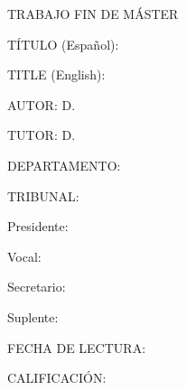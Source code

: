 {\setlength{\parindent}{0cm}
\begin{spanish}
{\scshape\Large TRABAJO FIN DE MÁSTER\par}
\vspace{1cm}
TÍTULO (Español): \myTitleEN \par
\vspace{0.3cm}
\end{spanish}
TITLE (English): \myTitleES \par
\vspace{0.5cm}
\begin{spanish}
AUTOR: D. \myFullname \par
\vspace{0.5cm}
TUTOR: D. \myTutorFullname \par
\vspace{0.5cm}
DEPARTAMENTO: \myDepartment \par
\vspace{2cm}

{\scshape\Large TRIBUNAL:\par}
\vspace{1cm}
Presidente:\par
\vspace{0.5cm}
Vocal:\par
\vspace{0.5cm}
Secretario:\par
\vspace{0.5cm}
Suplente:\par
\vspace{3cm}

FECHA DE LECTURA:\par
\vspace{2cm}
CALIFICACIÓN:\par
\end{spanish}
}

\afterpage{\blankpage}
\cleardoublepage